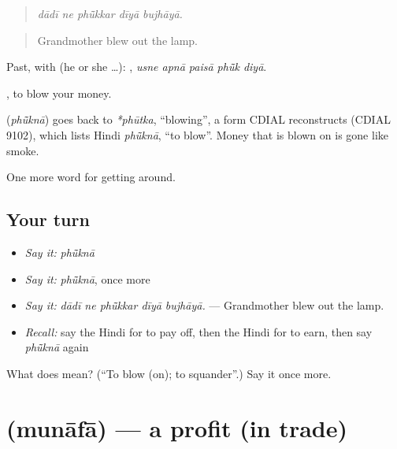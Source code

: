 \begin{quote}
    
\end{quote}

\begin{quote}
\emph{dādī ne phū̃kkar dīyā bujhāyā.}
\end{quote}

\begin{quote}
Grandmother blew out the lamp.
\end{quote}

Past, with  (he or she …):     , \emph{usne apnā paisā phū̃k diyā}.

 , to blow your money.

\begin{cousinweb}
\textbf{} (\emph{phū̃knā}) goes back to \emph{*phūtka}, \textquotedblleft{}blowing\textquotedblright{}, a form CDIAL reconstructs (CDIAL 9102), which lists Hindi \emph{phū̃knā}, \textquotedblleft{}to blow\textquotedblright{}. Money that is blown on is gone like smoke.
\end{cousinweb}

\begin{grammarlens}[title={What you've built}]
One more word for getting around.
\end{grammarlens}

\subsection*{Your turn}
\begin{itemize}
\raggedright
  \item \emph{Say it:} \emph{phū̃knā}
  \item \emph{Say it:} \emph{phū̃knā}, once more
  \item \emph{Say it:} \emph{dādī ne phū̃kkar dīyā bujhāyā.} — Grandmother blew out the lamp.
  \item \emph{Recall:} say the Hindi for to pay off, then the Hindi for to earn, then say \emph{phū̃knā} again
\end{itemize}

\begin{tcolorbox}[breakable,colback=teal!4,colframe=teal!35!black,title={Before you move on}]
What does  mean? (\textquotedblleft{}To blow (on); to squander\textquotedblright{}.) Say it once more.
\end{tcolorbox}
\section[\texorpdfstring{\hi{मुनाफ़ा} (munāfā)}{मुनाफ़ा (munāfā)}]{ (munāfā) — a profit (in trade)}

